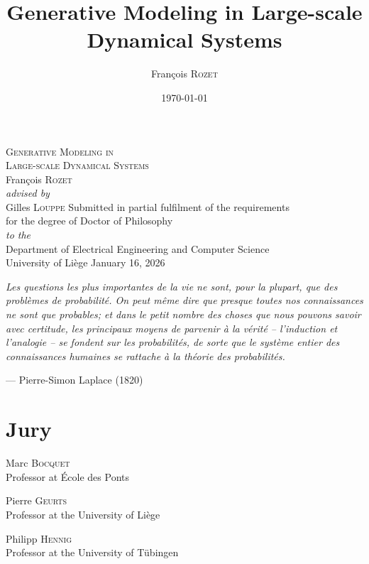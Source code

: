 \documentclass[a4paper, 10pt, oneside, openright]{book}
\title{Generative Modeling in Large-scale Dynamical Systems}
\author{François \textsc{Rozet}}
\date{\today}
\begin{document}

\begin{titlepage}
    \centering
    \hfill
    \vfill
    {\huge\scshape Generative Modeling in\\[1ex] Large-scale Dynamical Systems} \\[1.5cm]
    {\LARGE François \textsc{Rozet}} \\[2ex]
    {\Large\itshape advised by} \\[2ex]
    {\LARGE Gilles \textsc{Louppe}}
    \vfill
    {\large Submitted in partial fulfilment of the requirements\\[0.5ex] for the degree of Doctor of Philosophy} \\[2ex]
    {\large\itshape to the} \\[2ex]
    {\large Department of Electrical Engineering and Computer Science\\[0.5ex] University of Liège}
    \vfill
    {\large January 16, 2026}
    \hfill
\end{titlepage}

\restoregeometry

\frontmatter

\hfill
\vfill

\textit{Les questions les plus importantes de la vie ne sont, pour la plupart, que des problèmes de probabilité. On peut même dire que presque toutes nos connaissances ne sont que probables; et dans le petit nombre des choses que nous pouvons savoir avec certitude, les principaux moyens de parvenir à la vérité -- l'induction et l'analogie -- se fondent sur les probabilités, de sorte que le système entier des connaissances humaines se rattache à la théorie des probabilités.}

\begin{flushright}
    --- Pierre-Simon Laplace (1820)
\end{flushright}

\vfill
\hfill

\chapter*{Jury}

{\large Marc \textsc{Bocquet}} \\
Professor at École des Ponts

{\large Pierre \textsc{Geurts}} \\
Professor at the University of Liège

{\large Philipp \textsc{Hennig}} \\
Professor at the University of Tübingen
\end{document}
